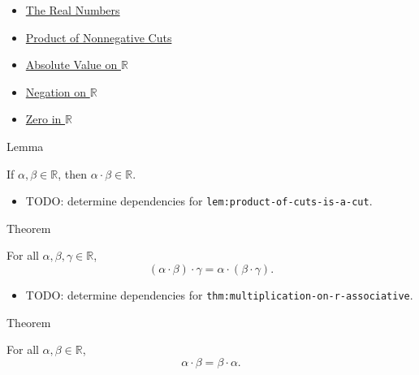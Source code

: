 \begin{dependencies}
\begin{itemize}
  \item \hyperref[def:reals]{The Real Numbers}
  \item \hyperref[def:product-nonnegative-on-r]{Product of Nonnegative Cuts}
  \item \hyperref[def:real-chapter-absolute-value-on-r]{Absolute Value on $\mathbb{R}$}
  \item \hyperref[def:negation-on-r]{Negation on $\mathbb{R}$}
  \item \hyperref[def:zero-in-r]{Zero in $\mathbb{R}$}
\end{itemize}
\end{dependencies}

\begin{lemmabox}{Lemma}
\begin{lemma}
\label{lem:product-of-cuts-is-a-cut}
If $\alpha,\beta\in\mathbb{R}$, then $\alpha\cdot\beta\in\mathbb{R}$.
\end{lemma}
\end{lemmabox}

\begin{dependencies}
\begin{itemize}
  \item TODO: determine dependencies for \texttt{lem:product-of-cuts-is-a-cut}.
\end{itemize}
\end{dependencies}

\begin{theorembox}{Theorem}
\begin{theorem}
\label{thm:multiplication-on-r-associative}
For all $\alpha,\beta,\gamma\in\mathbb{R}$,
\[
(\alpha\cdot\beta)\cdot\gamma=\alpha\cdot(\beta\cdot\gamma).
\]
\end{theorem}
\end{theorembox}

\begin{dependencies}
\begin{itemize}
  \item TODO: determine dependencies for \texttt{thm:multiplication-on-r-associative}.
\end{itemize}
\end{dependencies}

\begin{theorembox}{Theorem}
\begin{theorem}
\label{thm:multiplication-on-r-commutative}
For all $\alpha,\beta\in\mathbb{R}$,
\[
\alpha\cdot\beta=\beta\cdot\alpha.
\]
\end{theorem}
\end{theorembox}

